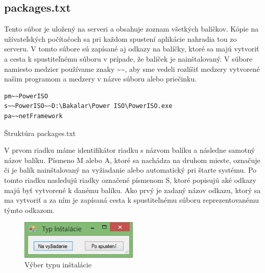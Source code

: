 \subsection{packages.txt}
Tento súbor je uložený na serveri a obsahuje zoznam všetkých balíčkov. Kópie na užívateľských počítačoch sa pri každom spustení aplikácie nahradia tou zo serveru. V tomto súbore sú zapísané aj odkazy na balíčky, ktoré sa majú vytvoriť a cesta k spustiteľnému súboru v prípade, že balíček je nainštalovaný. V súbore namiesto medzier používame znaky \textasciitilde\textasciitilde, aby sme vedeli rozlíšiť medzery vytvorené našim programom a medzery v názve súboru alebo priečinku.
\begin{listing}
\begin{verbatim}  
pm~~PowerISO
s~~PowerISO~~D:\Bakalar\Power ISO\PowerISO.exe
pa~~netFramework
\end{verbatim}
\caption{Štruktúra packages.txt}
\label{lst:pack}
\end{listing}
V prvom riadku máme identifikátor riadku s názvom balíku a následne samotný názov balíku. Písmeno M alebo A, ktoré sa nachádza na druhom mieste, označuje či je balík nainštalovaný na vyžiadanie alebo automatický pri štarte systému. Po tomto riadku nasledujú riadky označené písmenom S, ktoré popisujú aké odkazy majú byť vytvorené k danému balíku. Ako prvý je zadaný názov odkazu, ktorý sa ma vytvoriť a za ním je zapísaná cesta k spustiteľnému súboru reprezentovanému týmto odkazom.
\begin{figure}[h]
    \centering
    \includegraphics[width=0.5\textwidth]{installtype}
    \caption{Výber typu inštalácie}
    \label{fig:installtype}
\end{figure}


